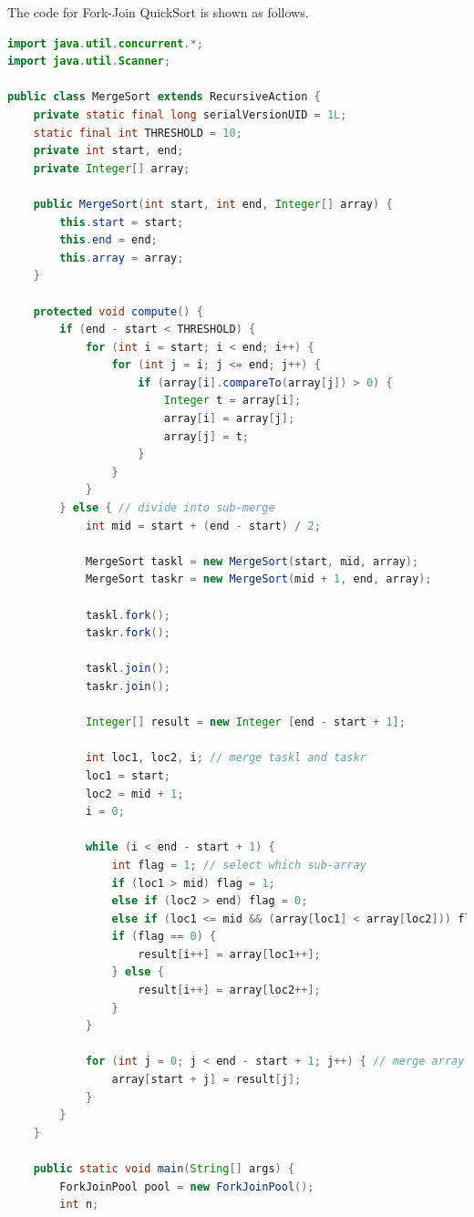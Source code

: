 \documentclass[UTF8,10pt,a4paper]{article}
\theoremstyle{Problem}
\theoremstyle{Solution}
\begin{document}
The code for Fork-Join QuickSort is shown as follows.
\begin{lstlisting}[language = java]
import java.util.concurrent.*;
import java.util.Scanner;

public class MergeSort extends RecursiveAction {
    private static final long serialVersionUID = 1L;
    static final int THRESHOLD = 10;
    private int start, end;
    private Integer[] array;

    public MergeSort(int start, int end, Integer[] array) {
        this.start = start;
        this.end = end;
        this.array = array;
    }

    protected void compute() {
        if (end - start < THRESHOLD) {
            for (int i = start; i < end; i++) {
                for (int j = i; j <= end; j++) {
                    if (array[i].compareTo(array[j]) > 0) {
                        Integer t = array[i];
                        array[i] = array[j];
                        array[j] = t;
                    }
                }
            }
        } else { // divide into sub-merge
            int mid = start + (end - start) / 2;
            
            MergeSort taskl = new MergeSort(start, mid, array);
            MergeSort taskr = new MergeSort(mid + 1, end, array);

            taskl.fork();
            taskr.fork();

            taskl.join();
            taskr.join();

            Integer[] result = new Integer [end - start + 1];
            
            int loc1, loc2, i; // merge taskl and taskr
            loc1 = start;
            loc2 = mid + 1;
            i = 0;
            
            while (i < end - start + 1) {
                int flag = 1; // select which sub-array
                if (loc1 > mid) flag = 1;
                else if (loc2 > end) flag = 0; 
                else if (loc1 <= mid && (array[loc1] < array[loc2])) flag = 0;
                if (flag == 0) {
                    result[i++] = array[loc1++];
                } else {
                    result[i++] = array[loc2++];
                }
            }
            
            for (int j = 0; j < end - start + 1; j++) { // merge array from result
                array[start + j] = result[j];
            }
        }
    }
    
    public static void main(String[] args) {
        ForkJoinPool pool = new ForkJoinPool();
        int n;


\end{lstlisting}
\end{document}
